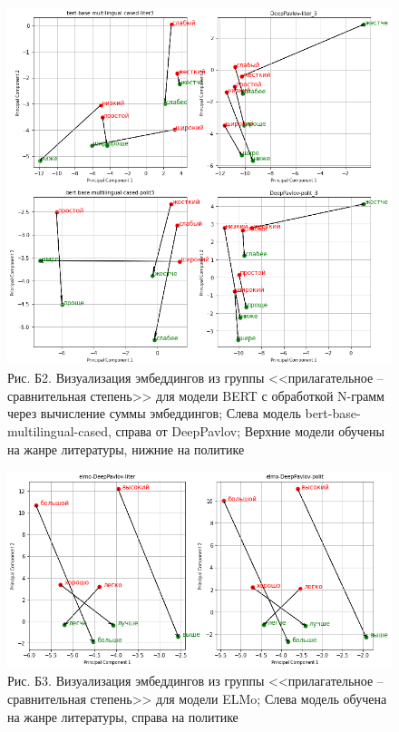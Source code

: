 \documentclass[a4paper,14pt]{article}
\begin{document}
\begin{figure}[H]
	\centering
	\includegraphics[width=0.95\linewidth]{image/pril_3}
	\caption*{Рис. Б2. Визуализация эмбеддингов из группы <<прилагательное -- сравнительная степень>> для модели BERT с обработкой N-грамм через вычисление суммы эмбеддингов; Слева модель bert-base-multilingual-cased, справа от DeepPavlov; Верхние модели обучены на жанре литературы, нижние на политике}
	\label{fig:pril32}
\end{figure}

\begin{figure}[H]
	\centering
	\includegraphics[width=0.95\linewidth]{image/elmo_pil}
	\caption*{Рис. Б3. Визуализация эмбеддингов из группы <<прилагательное -- сравнительная степень>> для модели ELMo; Слева модель обучена на жанре литературы, справа на политике}
	\label{fig:elmopil2}
\end{figure}
\end{document}
